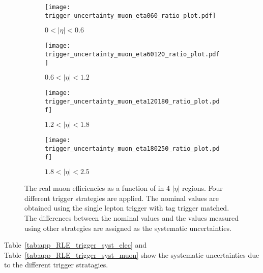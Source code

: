 \begin{figure}[htbp]
    \begin{subfigure}[b]{0.48\textwidth}
        \begin{center}
            \texttt{[image: trigger\_uncertainty\_muon\_eta060\_ratio\_plot.pdf]}
            \caption{$0 < |\eta| < 0.6$}
        \end{center}
    \end{subfigure}
    \begin{subfigure}[b]{0.48\textwidth}
        \begin{center}
            \texttt{[image: trigger\_uncertainty\_muon\_eta60120\_ratio\_plot.pdf]}
            \caption{$0.6 < |\eta| < 1.2$}
        \end{center}
    \end{subfigure}
    \begin{subfigure}[b]{0.48\textwidth}
        \begin{center}
            \texttt{[image: trigger\_uncertainty\_muon\_eta120180\_ratio\_plot.pdf]}
            \caption{$1.2 < |\eta| < 1.8$}
        \end{center}
    \end{subfigure}
    \begin{subfigure}[b]{0.48\textwidth}
        \begin{center}
            \texttt{[image: trigger\_uncertainty\_muon\_eta180250\_ratio\_plot.pdf]}
            \caption{$1.8 < |\eta| < 2.5$}
        \end{center}
    \end{subfigure}
    \caption{The real muon efficiencies as a function of \pt in 4 $|\eta|$ regions.
    Four different trigger strategies are applied.
    The nominal values are obtained using the single lepton trigger with tag trigger matched.
    The differences between the nominal values and the values measured using other strategies are assigned as the systematic uncertainties.}
    \label{fig:app_RLE_trigger_bias_muon}
\end{figure}

Table~\ref{tab:app_RLE_trigger_syst_elec} and Table~\ref{tab:app_RLE_trigger_syst_muon} show the systematic uncertainties due to the different trigger stratagies.

